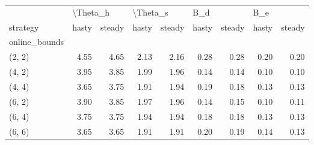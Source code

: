 \begin{tabular}{lrrrrrrrr}
\toprule
{} & \multicolumn{2}{l}{\textbackslash Theta\_h} & \multicolumn{2}{l}{\textbackslash Theta\_s} & \multicolumn{2}{l}{B\_d} & \multicolumn{2}{l}{B\_e} \\
strategy &    hasty & steady &    hasty & steady & hasty & steady & hasty & steady \\
online\_bounds &          &        &          &        &       &        &       &        \\
\midrule
(2, 2)        &     4.55 &   4.65 &     2.13 &   2.16 &  0.28 &   0.28 &  0.20 &   0.20 \\
(4, 2)        &     3.95 &   3.85 &     1.99 &   1.96 &  0.14 &   0.14 &  0.10 &   0.10 \\
(4, 4)        &     3.65 &   3.75 &     1.91 &   1.94 &  0.19 &   0.18 &  0.13 &   0.13 \\
(6, 2)        &     3.90 &   3.85 &     1.97 &   1.96 &  0.14 &   0.15 &  0.10 &   0.11 \\
(6, 4)        &     3.75 &   3.75 &     1.94 &   1.94 &  0.18 &   0.18 &  0.13 &   0.13 \\
(6, 6)        &     3.65 &   3.65 &     1.91 &   1.91 &  0.20 &   0.19 &  0.14 &   0.13 \\
\bottomrule
\end{tabular}
